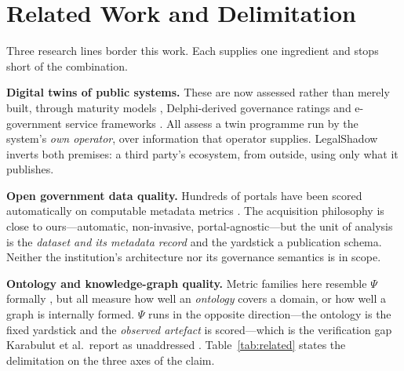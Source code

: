 \documentclass[engproc,proceedingpaper,submit,moreauthors]{Definitions/mdpi}
\begin{document}
\section{Related Work and Delimitation}
\label{sec:related}

Three research lines border this work. Each supplies one ingredient and stops short of the combination.

\textbf{Digital twins of public systems.} These are now assessed rather than merely built, through maturity models \cite{Haraguchi2024}, Delphi-derived governance ratings \cite{DiazSarachaga2025} and e-government service frameworks \cite{Anshari2022}. All assess a twin programme run by the system's \emph{own operator}, over information that operator supplies. LegalShadow inverts both premises: a third party's ecosystem, from outside, using only what it publishes.

\textbf{Open government data quality.} Hundreds of portals have been scored automatically on computable metadata metrics \cite{Neumaier2016,Kubler2018,Vetro2016}. The acquisition philosophy is close to ours---automatic, non-invasive, portal-agnostic---but the unit of analysis is the \emph{dataset and its metadata record} and the yardstick a publication schema. Neither the institution's architecture nor its governance semantics is in scope.

\textbf{Ontology and knowledge-graph quality.} Metric families here resemble $\Psi$ formally \cite{Zaitoun2023,AbadNavarro2025,Seo2022}, but all measure how well an \emph{ontology} covers a domain, or how well a graph is internally formed. $\Psi$ runs in the opposite direction---the ontology is the fixed yardstick and the \emph{observed artefact} is scored---which is the verification gap Karabulut et al.\ report as unaddressed \cite{Karabulut2024}. Table~\ref{tab:related} states the delimitation on the three axes of the claim.
\end{document}
